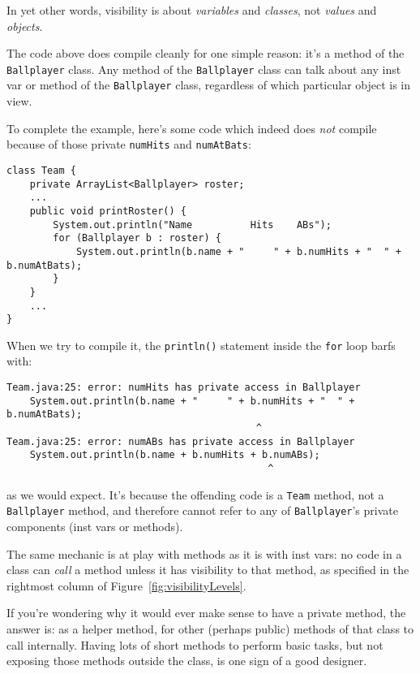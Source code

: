 In yet other words, visibility is about \textit{variables} and
\textit{classes}, not \textit{values} and \textit{objects}.

The code above does compile cleanly for one simple reason: it's a method of the
\texttt{Ballplayer} class. Any method of the \texttt{Ballplayer} class can talk
about any inst var or method of the \texttt{Ballplayer} class, regardless of
which particular object is in view.

To complete the example, here's some code which indeed does \textit{not}
compile because of those private \texttt{numHits} and \texttt{numAtBats}:

\begin{Verbatim}[fontsize=\footnotesize,samepage=true,frame=single]
class Team {
    private ArrayList<Ballplayer> roster;
    ...    
    public void printRoster() {
        System.out.println("Name          Hits    ABs");
        for (Ballplayer b : roster) {
            System.out.println(b.name + "     " + b.numHits + "  " + b.numAtBats);
        }
    }
    ...
}
\end{Verbatim}

\begin{samepage}
When we try to compile it, the \texttt{println()} statement inside the
\texttt{for} loop barfs with:
\footnotesize
\begin{verbatim}
Team.java:25: error: numHits has private access in Ballplayer
    System.out.println(b.name + "     " + b.numHits + "  " + b.numAtBats);
                                           ^
Team.java:25: error: numABs has private access in Ballplayer
    System.out.println(b.name + b.numHits + b.numABs);
                                             ^
\end{verbatim}
\normalsize
\vspace{-.2in}
as we would expect. It's because the offending code is a \texttt{Team} method,
not a \texttt{Ballplayer} method, and therefore cannot refer to any of
\texttt{Ballplayer}'s private components (inst vars or methods).
\end{samepage}

The same mechanic is at play with methods as it is with inst vars: no code in
a class can \textit{call} a method unless it has visibility to that method,
as specified in the rightmost column of Figure~\ref{fig:visibilityLevels}.

If you're wondering why it would ever make sense to have a private method, the
answer is: as a helper method, for other (perhaps public) methods of that
class to call internally. Having lots of short methods to perform basic tasks,
but not exposing those methods outside the class, is one sign of a good
designer.

